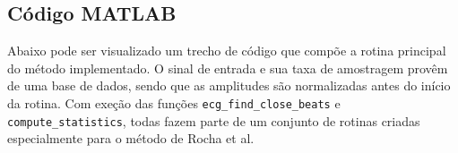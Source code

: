 \subsection{Código MATLAB}
Abaixo pode ser visualizado um trecho de código que compõe a rotina principal do método implementado. O sinal de entrada e sua taxa de amostragem provêm de uma base de dados, sendo que as amplitudes são normalizadas antes do início da rotina. Com exeção das funções \texttt{ecg\_find\_close\_beats} e \texttt{compute\_statistics}, todas fazem parte de um conjunto de rotinas criadas especialmente para o método de Rocha et al.


